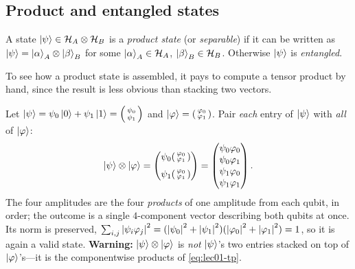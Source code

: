 \subsection{Product and entangled states}
\label{sec:lec01-buildprod}

\begin{definition}\label{def:lec01-product}
A state $\ket{\psi}\in\mathcal{H}_A\otimes\mathcal{H}_B$ is a \emph{product state} (or
\emph{separable}) if it can be written as $\ket{\psi}=\ket{\alpha}_A\otimes\ket{\beta}_B$
for some $\ket{\alpha}_A\in\mathcal{H}_A$, $\ket{\beta}_B\in\mathcal{H}_B$. Otherwise
$\ket{\psi}$ is \emph{entangled}.
\end{definition}

To see how a product state is assembled, it pays to compute a tensor product by hand,
since the result is less obvious than stacking two vectors.

\begin{example}\label{exa:lec01-tp-explicit}
Let $\ket{\psi}=\psi_0\ket0+\psi_1\ket1=\begin{psmallmatrix}\psi_0\\\psi_1\end{psmallmatrix}$
and $\ket{\varphi}=\begin{psmallmatrix}\varphi_0\\\varphi_1\end{psmallmatrix}$. Pair
\emph{each} entry of $\ket{\psi}$ with \emph{all} of $\ket{\varphi}$:
\begin{equation}\label{eq:lec01-tp}
  \ket{\psi}\otimes\ket{\varphi}
   =\begin{pmatrix}\psi_0\begin{psmallmatrix}\varphi_0\\\varphi_1\end{psmallmatrix}\\[6pt]
                   \psi_1\begin{psmallmatrix}\varphi_0\\\varphi_1\end{psmallmatrix}\end{pmatrix}
   =\begin{pmatrix}\psi_0\varphi_0\\ \psi_0\varphi_1\\ \psi_1\varphi_0\\ \psi_1\varphi_1\end{pmatrix}.
\end{equation}
The four amplitudes are the four \emph{products} of one amplitude from each qubit, in
order; the outcome is a single $4$-component vector describing both qubits at once.
Its norm is preserved,
$\sum_{i,j}\left\lvert \psi_i\varphi_j \right\rvert^{2}=(\left\lvert \psi_0 \right\rvert^2+\left\lvert \psi_1 \right\rvert^2)(\left\lvert \varphi_0 \right\rvert^2+\left\lvert \varphi_1 \right\rvert^2)=1$,
so it is again a valid state. \textbf{Warning:} $\ket{\psi}\otimes\ket{\varphi}$ is
\emph{not} $\ket{\psi}$'s two entries stacked on top of $\ket{\varphi}$'s---it is the
componentwise products of \eqref{eq:lec01-tp}.
\end{example}

